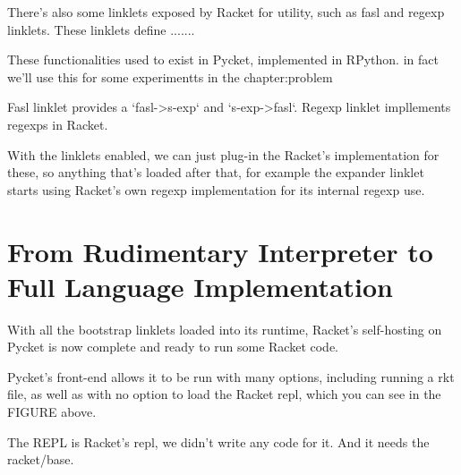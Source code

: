 			\begin{paragraph-here}%
				There's also some linklets exposed by Racket for utility, such as fasl and regexp linklets. These linklets define .......
			\end{paragraph-here}

			\begin{paragraph-here}%
				These functionalities used to exist in Pycket, implemented in RPython. in fact we'll use this for some experimentts in the chapter:problem
			\end{paragraph-here}

			\begin{paragraph-here}%
				Fasl linklet provides a `fasl->s-exp` and `s-exp->fasl`. Regexp linklet impllements regexps in Racket.
			\end{paragraph-here}

			\begin{paragraph-here}%
				With the linklets enabled, we can just plug-in the Racket's implementation for these, so anything that's loaded after that, for example the expander linklet starts using Racket's own regexp implementation for its internal regexp use.
			\end{paragraph-here}



	\section[\texorpdfstring{From Rudimentary Interpreter to Full Language Implementation}{Pycket as Full Racket}]{From Rudimentary Interpreter to Full Language Implementation}


		\begin{paragraph-here}%
			With all the bootstrap linklets loaded into its runtime, Racket's self-hosting on Pycket is now complete and ready to run some Racket code.
		\end{paragraph-here}

		\begin{paragraph-here}%
			Pycket's front-end allows it to be run with many options, including running a rkt file, as well as with no option to load the Racket repl, which you can see in the FIGURE above.
		\end{paragraph-here}

		\begin{paragraph-here}%
			The REPL is Racket's repl, we didn't write any code for it. And it needs the racket/base.
		\end{paragraph-here}

